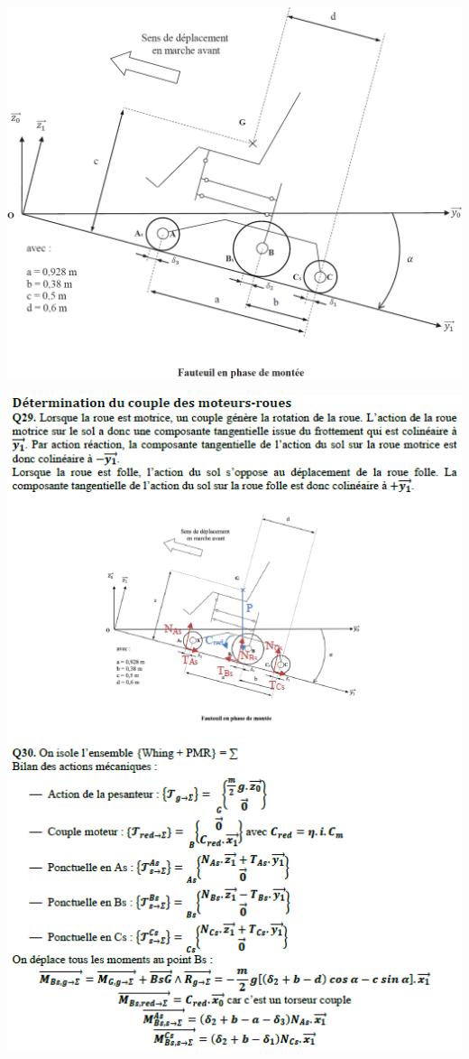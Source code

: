 \documentclass[10pt,fleqn]{article} %
\begin{document}
\begin{center}
\includegraphics[width=.8\linewidth]{images/fig_05}
\end{center}

\begin{center}
\includegraphics[width=\linewidth]{images/cor_01}
\end{center}
\end{document}
